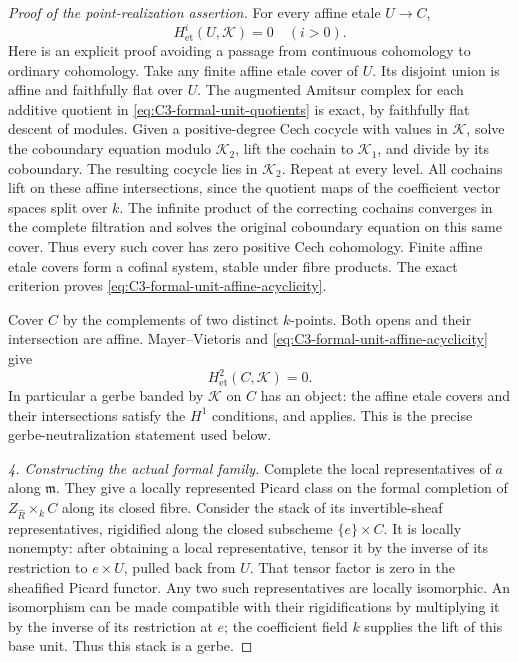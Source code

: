 \begin{proof}[Proof of the point-realization assertion]
For every affine etale $U\to C$,
\begin{equation}\label{eq:C3-formal-unit-affine-acyclicity}
                      H^i_{\mathrm{et}}(U,\mathcal K)=0
                                \quad(i>0).
\end{equation}
Here is an explicit proof avoiding a passage
from continuous cohomology to ordinary
cohomology. Take any finite affine etale
cover of $U$. Its disjoint union is affine
and faithfully flat over $U$. The augmented
Amitsur complex for each additive quotient
in \eqref{eq:C3-formal-unit-quotients} is
exact, by faithfully flat descent of modules.
Given a positive-degree Cech cocycle with
values in $\mathcal K$, solve the coboundary
equation modulo $\mathcal K_2$, lift the
cochain to $\mathcal K_1$, and divide by
its coboundary. The resulting cocycle lies
in $\mathcal K_2$. Repeat at every level.
All cochains lift on these affine intersections,
since the quotient maps of the coefficient
vector spaces split over $k$. The infinite
product of the correcting cochains converges
in the complete filtration and solves the
original coboundary equation on this same
cover. Thus every such cover has zero
positive Cech cohomology. Finite affine
etale covers form a cofinal system, stable
under fibre products. The exact criterion
\citet[Lemma 21.10.9]{D_StacksAlterationFamilies}
proves \eqref{eq:C3-formal-unit-affine-acyclicity}.

Cover $C$ by the complements of two distinct
$k$-points. Both opens and their intersection
are affine. Mayer--Vietoris and
\eqref{eq:C3-formal-unit-affine-acyclicity} give
\begin{equation}\label{eq:C3-formal-unit-curve-H2}
                           H^2_{\mathrm{et}}(C,\mathcal K)=0.
\end{equation}
In particular a gerbe banded by $\mathcal K$
on $C$ has an object: the affine etale covers
and their intersections satisfy the $H^1$
conditions, and
\citet[Lemma 21.11.1, Tag 0CK0]{D_StacksAlterationFamilies}
applies. This is the precise gerbe-neutralization
statement used below.

\emph{4. Constructing the actual formal family.}
Complete the local representatives of $a$
along $\mathfrak m$. They give a locally
represented Picard class on the formal
completion of $Z_{\widehat R}\times_k C$
along its closed fibre. Consider the stack
of its invertible-sheaf representatives,
rigidified along the closed subscheme
$\{e\}\times C$. It is locally nonempty:
after obtaining a local representative,
tensor it by the inverse of its restriction
to $e\times U$, pulled back from $U$.
That tensor factor is zero in the sheafified
Picard functor. Any two such representatives
are locally isomorphic. An isomorphism can
be made compatible with their rigidifications
by multiplying it by the inverse of its
restriction at $e$; the coefficient field
$k$ supplies the lift of this base unit.
Thus this stack is a gerbe.


\end{proof}
